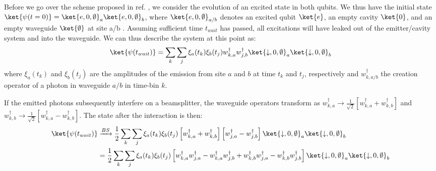 Before we go over the scheme proposed in ref. \cite{Barrett2004EfficientOptics}, we consider the evolution of an excited state in both qubits. We thus have the initial state $\ket{\psi(t=0)} = \ket{e,0,\emptyset}_a \ket{e,0,\emptyset}_b$, where $\ket{e,0,\emptyset}_{a/b}$ denotes an excited qubit $\ket{e}$, an empty cavity $\ket{0}$, and an empty waveguide $\ket{\emptyset}$ at site a/b . Assuming sufficient time $t_{wait}$ has passed, all excitations will have leaked out of the emitter/cavity system and into the waveguide. We can thus describe the system at this point as:
\begin{equation}
     \ket{\psi(t_{wait})} = \sum_k \sum_j \xi_a(t_k)\xi_b(t_j) 
 w_{k,a}^\dagger w_{j,b}^\dagger \ket{\downarrow,0,\emptyset}_a \ket{\downarrow,0,\emptyset}_b
\end{equation}
where $\xi_a(t_k)$ and $\xi_b(t_j)$ are the amplitudes of the emission from site $a$ and $b$ at time $t_k$ and $t_j$, respectively and $w_{k,a/b}^\dagger$ the creation operator of a photon in waveguide $a/b$ in time-bin $k$.  

If the emitted photons subsequently interfere on a beamsplitter, the waveguide operators transform as $w_{k,a}^\dagger \rightarrow \frac{1}{\sqrt{2}} \left [ w_{k,a}^\dagger + w_{k,b}^\dagger \right ]$ and $w_{k,b}^\dagger \rightarrow \frac{1}{\sqrt{2}} \left [ w_{k,a}^\dagger - w_{k,b}^\dagger \right ]$. The state after the interaction is then: 
\begin{align}
    \ket{\psi(t_{wait})}  &\xrightarrow{BS} \frac{1}{2} \sum_k \sum_j \xi_a(t_k)\xi_b(t_j) \left [w_{k,a}^\dagger+w_{k,b}^\dagger \right ] \left [w_{j,a}^\dagger-w_{j,b}^\dagger \right ]  \ket{\downarrow,0,\emptyset}_a \ket{\downarrow,0,\emptyset}_b \\
    &=  \frac{1}{2} \sum_k \sum_j \xi_a(t_k)\xi_b(t_j) \left [w_{k,a}^\dagger w_{j,a}^\dagger - w_{k,a}^\dagger w_{j,b}^\dagger + w_{k,b}^\dagger w_{j,a}^\dagger - w_{k,b}^\dagger w_{j,b}^\dagger \right ] \ket{\downarrow,0,\emptyset}_a \ket{\downarrow,0,\emptyset}_b
\end{align}

